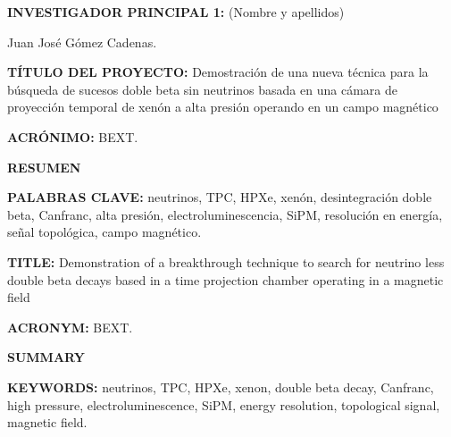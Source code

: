 \documentclass[a4paper,11pt,oneside]{article}
\begin{document}

\vspace{6pt}

\noindent\textbf{INVESTIGADOR  PRINCIPAL 1:} (Nombre y apellidos)

\noindent Juan José Gómez Cadenas.
\vspace{6pt}


\noindent\textbf{TÍTULO DEL PROYECTO:} Demostración de una nueva técnica para la búsqueda de sucesos doble beta sin neutrinos basada en una cámara de proyección temporal de xenón a alta presión operando en un campo magnético  

\vspace{6pt}

\noindent\textbf{ACRÓNIMO:} BEXT.


\noindent\textbf{RESUMEN} 
{\color{blue}{M\'aximo 2000 caracteres (incluyendo espacios en blanco):}}
\vspace{12pt}


 
\vspace{12pt}

\noindent\textbf{PALABRAS CLAVE:} neutrinos, TPC, HPXe, xenón, desintegración doble beta, Canfranc, alta presión, electroluminescencia, SiPM, resolución en energía, señal topológica, campo magnético. 

\vspace{12pt}

\noindent\textbf{TITLE:} Demonstration of a breakthrough technique to search for neutrino less double beta decays based in a time projection chamber operating in a magnetic field
\vspace{6pt}

\noindent\textbf{ACRONYM:} BEXT.
\vspace{6pt}

\noindent\textbf{SUMMARY} 
\vspace{6pt}



 \vspace{12pt}

\noindent\textbf{KEYWORDS:} neutrinos, TPC, HPXe, xenon, double beta decay, Canfranc, high pressure, electroluminescence, SiPM, energy resolution, topological signal, magnetic field. 
\end{document}
